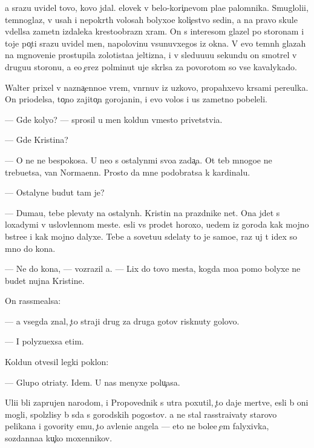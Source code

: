 \documentclass[10pt]{book}
\begin{document}
{\Y}a srazu uvidel tovo, kovo jdal. {\C}elovek v belo-kori{\c}nevom pla{\x}e palomnika. Smugloli{\q}i{\y}, temnoglaz{\yi}{\y}, v usah i nepokr{\yi}t{\yi}h volosah bolyxo{\y}e koli{\c}estvo sedin{\yi}, a na pravo{\y} skule v{\yi}del{\ia}lsa zametn{\yi}{\y} izdaleka krestoobrazn{\yi}{\y} xram. On s interesom glazel po storonam i toje po{\c}ti srazu uvidel men{\ia}, napolovinu v{\yi}sunuvxegos{\ia} iz okna. V {\y}evo temn{\yi}h glazah na mgnoveni{\y}e prostupila zolotista{\y}a jeltizna, i v sledu{\y}u{\x}u{\y}u sekundu on smotrel v drugu{\y}u storonu, a {\y}e{\x}o {\c}erez polminut{\yi} uje skr{\yi}lsa za povorotom so vse{\y} kavalykado{\y}.



Walter prixel v nazna{\c}enno{\y}e vrem{\ia}, v{\yi}n{\yi}rnuv iz uzkovo, propahxevo kr{\yi}sami pereulka. On priodelsa, to{\c}no zajito{\c}n{\yi}{\y} gorojanin, i {\y}evo volos{\yi} i us{\yi} zametno pobeleli.

— Gde koly{\q}o? — sprosil u men{\ia} koldun vmesto privetstvi{\y}a.

— Gde Kristina?

— O ne{\y} ne bespoko{\y}sa. U ne{\y}o s ostalyn{\yi}mi svo{\y}a zada{\c}a. Ot teb{\ia} mnogo{\y}e ne trebu{\y}etsa, van Normaenn. Prosto da{\y} mne podobratsa k kardinalu.

— Ostalyn{\yi}{\y}e budut tam je?

— Duma{\y}u, tebe plevaty na ostalyn{\yi}h. Kristin{\yi} na prazdnike net. Ona jdet s loxadymi v uslovlennom meste. {\Y}esli vs{\e} pro{\y}det horoxo, u{\y}edem iz goroda kak mojno b{\yi}stre{\y}e i kak mojno dalyxe. Tebe {\y}a sovetu{\y}u sdelaty to je samo{\y}e, raz uj t{\yi} idex so mno{\y} do kon{\q}a.

— Ne do kon{\q}a, — vozrazil {\y}a. — Lix do tovo mesta, kogda mo{\y}a pomo{\x} bolyxe ne budet nujna Kristine.

On rassme{\y}alsa:

— {\Y}a vsegda znal, {\c}to straji drug za druga gotov{\yi} risknuty golovo{\y}.

— I polyzu{\y}exsa etim.

Koldun otvesil legki{\y} poklon:

— Glupo otri{\q}aty. Idem. U nas menyxe polu{\c}asa.

Uli{\q}i b{\yi}li zaprujen{\yi} narodom, i Propovednik s utra poxutil, {\c}to daje mertv{\yi}{\y}e, {\y}esli b{\yi} oni mogli, spolzlisy b{\yi} s{\iu}da s gorodskih pogostov. {\Y}a ne stal rasstra{\y}ivaty starovo pelikana i govority {\y}emu, {\c}to {\y}avleni{\y}e angela — eto ne bole{\y}e {\c}em falyxivka, sozdanna{\y}a ku{\c}ko{\y} moxennikov.
\end{document}
